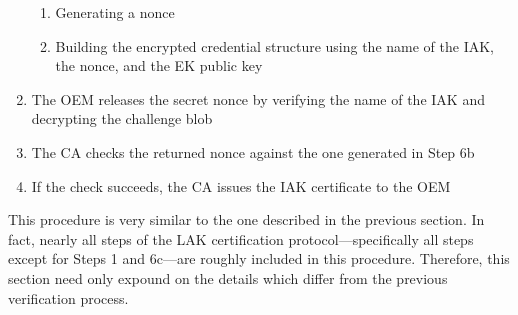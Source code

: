 \begin{enumerate}[itemsep=0pt,parsep=0pt,partopsep=0pt]
\begin{enumerate}[topsep=0pt, itemsep=0pt,parsep=0pt,partopsep=0pt]
    \item Generating a nonce
    \item Building the encrypted credential structure using the name of the IAK, the nonce, and the EK public key
  \end{enumerate}
  \item The OEM releases the secret nonce by verifying the name of the IAK and decrypting the challenge blob
  \item The CA checks the returned nonce against the one generated in Step 6b
  \item If the check succeeds, the CA issues the IAK certificate to the OEM
\end{enumerate}

This procedure is very similar to the one described in the previous section. In fact, nearly all steps of the LAK certification protocol---specifically all steps except for Steps 1 and 6c---are roughly included in this procedure. Therefore, this section need only expound on the details which differ from the previous verification process. 

